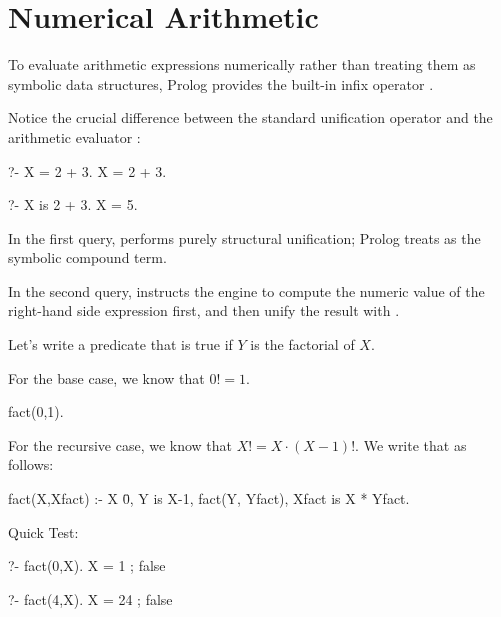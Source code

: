 \section{Numerical Arithmetic}
To evaluate arithmetic expressions numerically rather than treating them as symbolic data structures, Prolog provides the built-in infix operator .

\begin{example}{}
Notice the crucial difference between the standard unification operator \inlinecode{=} and the arithmetic evaluator :

\begin{codeblock}
?- X = 2 + 3.
X = 2 + 3.

?- X is 2 + 3.
X = 5.
\end{codeblock}

In the first query,  performs purely structural unification; Prolog treats  as the symbolic compound term. 

In the second query,  instructs the engine to compute the numeric value of the right-hand side expression first, and then unify the result with .
\end{example}


Let's write a predicate  that is true if $Y$ is the factorial of $X$. 

For the base case, we know that $0! = 1$.

\begin{codeblock}
fact(0,1).
\end{codeblock}

For the recursive case, we know that $X! = X \cdot (X-1)!$. We write that as follows:

\begin{codeblock}
fact(X,Xfact) :-
    X \= 0,               %
    Y is X-1,
    fact(Y, Yfact), 
    Xfact is X * Yfact.
\end{codeblock}

Quick Test:

\begin{codeblock}
?- fact(0,X).
X = 1
;
false
\end{codeblock}

\begin{codeblock}
?- fact(4,X).
X = 24
;
false
\end{codeblock}

